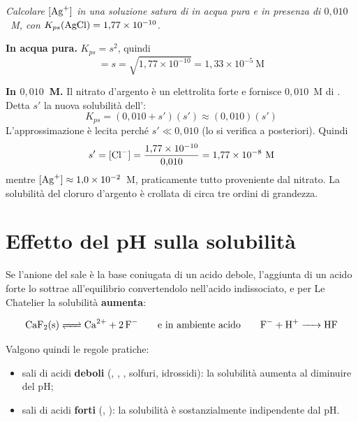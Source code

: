 \documentclass[11pt, a4paper, openright]{book}
\begin{document}
\emph{Calcolare $[\ce{Ag+}]$ in una soluzione satura di  in acqua pura e in
presenza di  $0{,}010$~M, con $K_{ps}(\ce{AgCl}) = 1{,}77 \times 10^{-10}$.}

\medskip
\noindent\textbf{In acqua pura.} $K_{ps} = s^2$, quindi
\begin{equation*}
  [\ce{Ag+}] = s = \sqrt{1{,}77 \times 10^{-10}} = 1{,}33 \times 10^{-5} \ \text{M}
\end{equation*}

\noindent\textbf{In  $0{,}010$~M.} Il nitrato d'argento è un elettrolita forte e
fornisce $0{,}010$~M di . Detta $s'$ la nuova solubilità dell':
\begin{equation*}
  K_{ps} = (0{,}010 + s')(s') \approx (0{,}010)(s')
\end{equation*}
L'approssimazione è lecita perché $s' \ll 0{,}010$ (lo si verifica a posteriori). Quindi
\begin{equation*}
  s' = [\ce{Cl-}] = \frac{1{,}77 \times 10^{-10}}{0{,}010} = 1{,}77 \times 10^{-8} \ \text{M}
\end{equation*}
mentre $[\ce{Ag+}] \approx 1{,}0 \times 10^{-2}$~M, praticamente tutto proveniente dal
nitrato. La solubilità del cloruro d'argento è crollata di circa tre ordini di grandezza.


\section{Effetto del pH sulla solubilità}

Se l'anione del sale è la base coniugata di un acido debole, l'aggiunta di un acido forte
lo sottrae all'equilibrio convertendolo nell'acido indissociato, e per Le Chatelier la
solubilità \textbf{aumenta}:

\begin{equation*}
  \ce{CaF2(s) <=> Ca^2+ + 2 F-}
  \qquad\text{e in ambiente acido}\qquad
  \ce{F- + H+ -> HF}
\end{equation*}

Valgono quindi le regole pratiche:

\begin{itemize}
  \item sali di acidi \textbf{deboli} (, , , solfuri,
        idrossidi): la solubilità aumenta al diminuire del pH;
  \item sali di acidi \textbf{forti} (, ): la solubilità è
        sostanzialmente indipendente dal pH.
\end{itemize}
\end{document}
